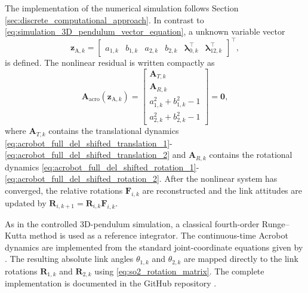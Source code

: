 The implementation of the numerical simulation follows Section \ref{sec:discrete_computational_approach}. In contrast to \eqref{eq:simulation_3D_pendulum_vector_equation}, a unknown variable vector
\[
\bm{z}_{\mathrm{A},k}
=
\begin{bmatrix}
a_{1,k} & b_{1,k} & a_{2,k} & b_{2,k} &
\bm{\lambda}_{0,k}^{\top} &
\bm{\lambda}_{12,k}^{\top}
\end{bmatrix}^{\top},
\]
is defined. The nonlinear residual is written compactly as
\[
\bm{A}_{\mathrm{acro}}(\bm{z}_{\mathrm{A},k})
=
\begin{bmatrix}
\bm{A}_{T,k}\\
\bm{A}_{R,k}\\
a_{1,k}^2+b_{1,k}^2-1\\
a_{2,k}^2+b_{2,k}^2-1
\end{bmatrix}
=
\bm{0},
\]
where \(\bm{A}_{T,k}\) contains the translational dynamics \eqref{eq:acrobot_full_del_shifted_translation_1}-\eqref{eq:acrobot_full_del_shifted_translation_2} and \(\bm{A}_{R,k}\) contains the rotational dynamics \eqref{eq:acrobot_full_del_shifted_rotation_1}-\eqref{eq:acrobot_full_del_shifted_rotation_2}. After the nonlinear system has converged, the relative rotations \(\bm{F}_{i,k}\) are reconstructed and the link attitudes are updated by \(\bm{R}_{i,k+1}=\bm{R}_{i,k}\bm{F}_{i,k}\).

As in the controlled 3D-pendulum simulation, a classical fourth-order Runge--Kutta method is used as a reference integrator. The continuous-time Acrobot dynamics are implemented from the standard joint-coordinate equations given by \cite{tedrake_underactuated}. The resulting absolute link angles $\theta_{1,k}$ and $\theta_{2,k}$ are
mapped directly to the link rotations $\bm{R}_{1,k}$ and $\bm{R}_{2,k}$
using \eqref{eq:so2_rotation_matrix}. The complete implementation is documented in the GitHub repository \cite{Elshani2026CTO_GitHub}.

